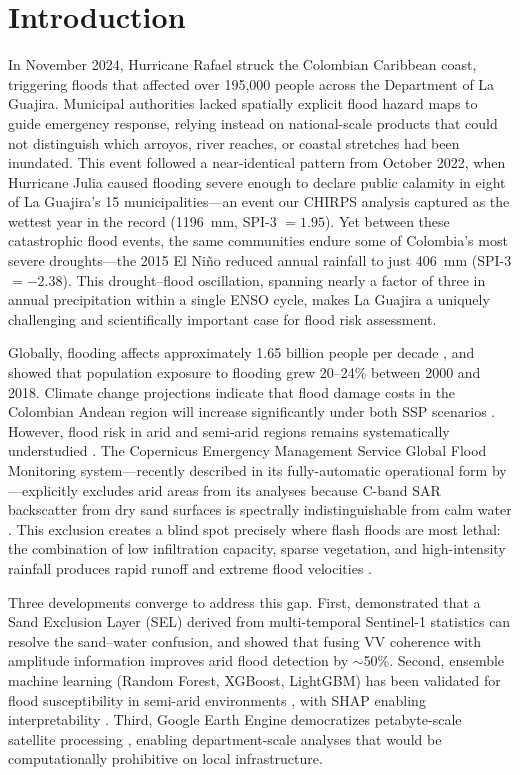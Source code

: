 \documentclass{article}
\begin{document}
\section{Introduction}
\label{sec:introduction}

In November 2024, Hurricane Rafael struck the Colombian Caribbean coast, triggering floods that affected over 195,000 people across the Department of La Guajira. Municipal authorities lacked spatially explicit flood hazard maps to guide emergency response, relying instead on national-scale products that could not distinguish which arroyos, river reaches, or coastal stretches had been inundated. This event followed a near-identical pattern from October 2022, when Hurricane Julia caused flooding severe enough to declare public calamity in eight of La Guajira's 15 municipalities---an event our CHIRPS analysis captured as the wettest year in the record (\SI{1196}{\milli\metre}, SPI-3 $= 1.95$). Yet between these catastrophic flood events, the same communities endure some of Colombia's most severe droughts---the 2015 El Ni\~no reduced annual rainfall to just \SI{406}{\milli\metre} (SPI-3 $= -2.38$). This drought--flood oscillation, spanning nearly a factor of three in annual precipitation within a single ENSO cycle, makes La Guajira a uniquely challenging and scientifically important case for flood risk assessment.

Globally, flooding affects approximately 1.65 billion people per decade \citep{UNDRR2020}, and \citet{Tellman2021} showed that population exposure to flooding grew 20--24\% between 2000 and 2018. Climate change projections indicate that flood damage costs in the Colombian Andean region will increase significantly under both SSP scenarios \citep{RodriguezEspinoza2025}. However, flood risk in arid and semi-arid regions remains systematically understudied \citep{Alabbad2023}. The Copernicus Emergency Management Service Global Flood Monitoring system---recently described in its fully-automatic operational form by \citet{WagnerGFM2025}---explicitly excludes arid areas from its analyses because C-band SAR backscatter from dry sand surfaces is spectrally indistinguishable from calm water \citep{Garg2024}. This exclusion creates a blind spot precisely where flash floods are most lethal: the combination of low infiltration capacity, sparse vegetation, and high-intensity rainfall produces rapid runoff and extreme flood velocities \citep{Alabbad2023}.

Three developments converge to address this gap. First, \citet{Martinis2018} demonstrated that a Sand Exclusion Layer (SEL) derived from multi-temporal Sentinel-1 statistics can resolve the sand--water confusion, and \citet{Garg2024} showed that fusing VV coherence with amplitude information improves arid flood detection by $\sim$50\%. Second, ensemble machine learning (Random Forest, XGBoost, LightGBM) has been validated for flood susceptibility in semi-arid environments \citep{Bammou2024, Abedi2022}, with SHAP enabling interpretability \citep{Lundberg2017}. Third, Google Earth Engine democratizes petabyte-scale satellite processing \citep{Gorelick2017}, enabling department-scale analyses that would be computationally prohibitive on local infrastructure.
\end{document}
